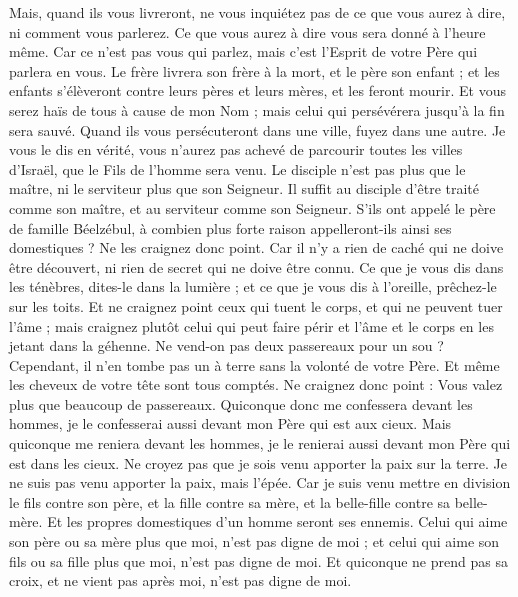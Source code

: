 \begin{multicols}{2}
Mais, quand ils vous livreront, ne vous inquiétez pas de ce que vous aurez à dire, ni comment vous parlerez. Ce que vous aurez à dire vous sera donné à l’heure même.
Car ce n'est pas vous qui parlez, mais c'est l'Esprit de votre Père qui parlera en vous.
Le frère livrera son frère à la mort, et le père son enfant ; et les enfants s'élèveront contre leurs pères et leurs mères, et les feront mourir.
Et vous serez haïs de tous à cause de mon Nom ; mais celui qui persévérera jusqu’à la fin sera sauvé.
Quand ils vous persécuteront dans une ville, fuyez dans une autre. Je vous le dis en vérité, vous n'aurez pas achevé de parcourir toutes les villes d'Israël, que le Fils de l'homme sera venu.
Le disciple n'est pas plus que le maître, ni le serviteur plus que son Seigneur.
Il suffit au disciple d'être traité comme son maître, et au serviteur comme son Seigneur. S’ils ont appelé le père de famille Béelzébul, à combien plus forte raison appelleront-ils ainsi ses domestiques ?
Ne les craignez donc point. Car il n'y a rien de caché qui ne doive être découvert, ni rien de secret qui ne doive être connu.
Ce que je vous dis dans les ténèbres, dites-le dans la lumière ; et ce que je vous dis à l'oreille, prêchez-le sur les toits.
Et ne craignez point ceux qui tuent le corps, et qui ne peuvent tuer l'âme ; mais craignez plutôt celui qui peut faire périr et l'âme et le corps en les jetant dans la géhenne.
Ne vend-on pas deux passereaux pour un sou ? Cependant, il n’en tombe pas un à terre sans la volonté de votre Père.
Et même les cheveux de votre tête sont tous comptés.
Ne craignez donc point : Vous valez plus que beaucoup de passereaux.
Quiconque donc me confessera devant les hommes, je le confesserai aussi devant mon Père qui est aux cieux.
Mais quiconque me reniera devant les hommes, je le renierai aussi devant mon Père qui est dans les cieux.
Ne croyez pas que je sois venu apporter la paix sur la terre. Je ne suis pas venu apporter la paix, mais l'épée.
Car je suis venu mettre en division le fils contre son père, et la fille contre sa mère, et la belle-fille contre sa belle-mère.
Et les propres domestiques d'un homme seront ses ennemis.
Celui qui aime son père ou sa mère plus que moi, n'est pas digne de moi ; et celui qui aime son fils ou sa fille plus que moi, n'est pas digne de moi.
Et quiconque ne prend pas sa croix, et ne vient pas après moi, n'est pas digne de moi.

\end{multicols}
